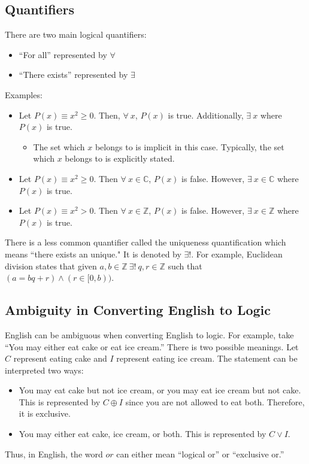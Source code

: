 \subsection{Quantifiers}

There are two main logical quantifiers:
\begin{itemize}
    \item ``For all'' represented by \(\forall\)
    \item ``There exists'' represented by \(\exists\)
\end{itemize}

Examples:
\begin{itemize}
    \item Let \(P(x)\equiv x^2\ge0\). Then, \(\forall\:x\), \(P(x)\) is true. Additionally, \(\exists\:x\) where \(P(x)\) is true.
    \begin{itemize}
        \item The set which \(x\) belongs to is implicit in this case. Typically, the set which \(x\) belongs to is explicitly stated.
    \end{itemize}
    \item Let \(P(x)\equiv x^2\ge0\). Then \(\forall\:x\in\mathbb{C}\), \(P(x)\) is false. However, \(\exists\:x\in\mathbb{C}\) where \(P(x)\) is true.
    \item Let \(P(x)\equiv x^2>0\). Then \(\forall\:x\in\mathbb{Z}\), \(P(x)\) is false. However, \(\exists\:x\in\mathbb{Z}\) where \(P(x)\) is true.
\end{itemize}

There is a less common quantifier called the uniqueness quantification which means ``there exists an unique." It is denoted by \(\exists!\). For example,
Euclidean division states that given \(a,b\in\mathbb{Z}\:\exists!\:q,r\in\mathbb{Z}\) such that \((a=bq+r)\land(r\in[0,b))\).

\subsection{Ambiguity in Converting English to Logic}

English can be ambiguous when converting English to logic. For example, take ``You may either eat cake or eat ice cream.'' There is two possible meanings.
Let \(C\) represent eating cake and \(I\) represent eating ice cream. The statement can be interpreted two ways:
\begin{itemize}
    \item You may eat cake but not ice cream, or you may eat ice cream but not cake. This is represented by \(C\oplus I\) since you are not allowed to eat
    both. Therefore, it is exclusive.
    \item You may either eat cake, ice cream, or both. This is represented by \(C\lor I\).
\end{itemize}
Thus, in English, the word \(or\) can either mean ``logical or'' or ``exclusive or.''

